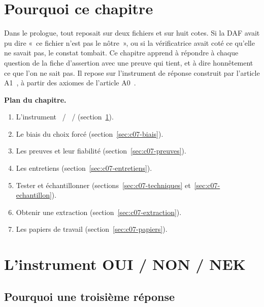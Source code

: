\bigskip

\section*{Pourquoi ce chapitre}

Dans le prologue, tout reposait sur deux fichiers et sur huit cotes. Si la
DAF avait pu dire «~ce fichier n'est pas le nôtre~», ou si la vérificatrice
avait coté \OUI{} ce qu'elle ne savait pas, le constat tombait. Ce chapitre
apprend à répondre à chaque question de la fiche d'assertion avec une
preuve qui tient, et à dire honnêtement ce que l'on ne sait pas. Il repose
sur l'instrument de réponse construit par l'article A1~\cite{minka2026nek},
à partir des axiomes de l'article A0~\cite{minka2026auditologie}.

\medskip
\textbf{Plan du chapitre.}
\begin{enumerate}
    \item L'instrument \OUI{}~/ \NON{}~/ \NEK{} (section~\ref{sec:c07-instrument}).
    \item Le biais du choix forcé (section~\ref{sec:c07-biais}).
    \item Les preuves et leur fiabilité (section~\ref{sec:c07-preuves}).
    \item Les entretiens (section~\ref{sec:c07-entretiens}).
    \item Tester et échantillonner (sections~\ref{sec:c07-techniques}
          et~\ref{sec:c07-echantillon}).
    \item Obtenir une extraction (section~\ref{sec:c07-extraction}).
    \item Les papiers de travail (section~\ref{sec:c07-papiers}).
\end{enumerate}

\separateur

\section{L'instrument OUI / NON / NEK}
\label{sec:c07-instrument}

\subsection{Pourquoi une troisième réponse}

